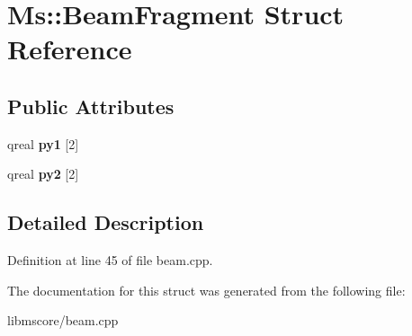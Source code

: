 \hypertarget{struct_ms_1_1_beam_fragment}{}\section{Ms\+:\+:Beam\+Fragment Struct Reference}
\label{struct_ms_1_1_beam_fragment}
\subsection*{Public Attributes}
\begin{DoxyCompactItemize}
\item 
\mbox{\label{struct_ms_1_1_beam_fragment_a23a379f64f3554eed66d50ef7268ccf4}} 
qreal {\bfseries py1} \mbox{[}2\mbox{]}
\item 
\mbox{\label{struct_ms_1_1_beam_fragment_ab77536fb54ca3bb32131f199d86895db}} 
qreal {\bfseries py2} \mbox{[}2\mbox{]}
\end{DoxyCompactItemize}


\subsection{Detailed Description}


Definition at line 45 of file beam.\+cpp.



The documentation for this struct was generated from the following file\+:\begin{DoxyCompactItemize}
\item 
libmscore/beam.\+cpp\end{DoxyCompactItemize}
